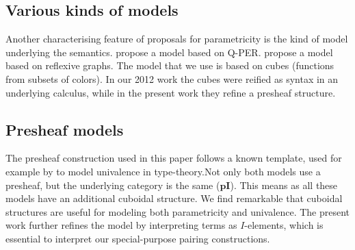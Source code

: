 \documentclass[english]{PaperTools/latex/lipics}
\def\pI{\ensuremath{\mathbf{pI}}}
\begin{document}
\subsection{Various kinds of models}
Another characterising feature of proposals for parametricity is the
kind of model underlying the
semantics.  propose a model
based on Q-PER.  propose a model based
on reflexive graphs. The model that we use is based on cubes
(functions from subsets of colors). In
our 2012 work the cubes were reified as syntax in
an underlying calculus, while in the present work they refine a presheaf structure.

\subsection{Presheaf models}

The presheaf construction used in this paper follows a known template,
used for example by \citet{bezem2014model,DBLP:journals/corr/Pitts14}
to model univalence in type-theory.Not only both models use a
presheaf, but the underlying category is the same ($\pI$). This means
as all these models have an additional cuboidal structure.  We find
remarkable that cuboidal structures are useful for modeling both
parametricity and univalence. The present work further refines the
model by interpreting terms as $I$-elements, which is essential to
interpret our special-purpose pairing constructions.




\end{document}
